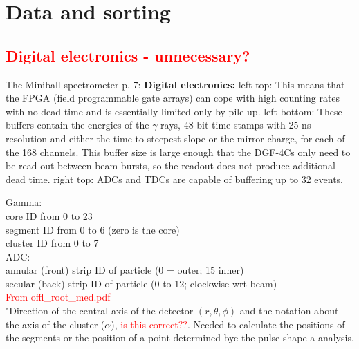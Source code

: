 \documentclass[twoside,english]{uiofysmaster/uiofysmaster}
\newcommand{\ga}{$\gamma$}
\begin{document}
\section{Data and sorting}

\subsection{\textcolor{red}{Digital electronics - unnecessary?}}

The Miniball spectrometer \cite{MB-spect} \newline
p. 7: \newline
\textbf{Digital electronics:} \newline
left top: \newline
This means that the FPGA (field programmable gate arrays) can cope with high counting rates with no dead time and is essentially limited only by pile-up. \newline
left bottom: \newline
These buffers contain the energies of the \ga-rays, 48 bit time stamps with 25 ns resolution and either the time to steepest slope or the mirror charge, for each of the 168 channels. This buffer size is large enough that the DGF-4Cs only need to be read out between beam bursts, so the readout does not produce additional dead time. \newline
right top: \newline
ADCs and TDCs are capable of buffering up to 32 events. \newline



Gamma: \\
core ID from 0 to 23 \\
segment ID from 0 to 6 (zero is the core) \\
cluster ID from 0 to 7 \\

ADC: \\
annular (front) strip ID of particle (0 = outer; 15 inner) \\
secular (back) strip ID of particle (0 to 12; clockwise wrt beam) \\

\textcolor{red}{From offl\_root\_med.pdf} \\
"Direction of the central axis of the detector $(r, \theta, \phi)$ and the notation about the axis of the cluster ($\alpha$), \textcolor{red}{is this correct??}. Needed to calculate the positions of the segments or the position of a point determined bye the pulse-shape a analysis.
\end{document}
